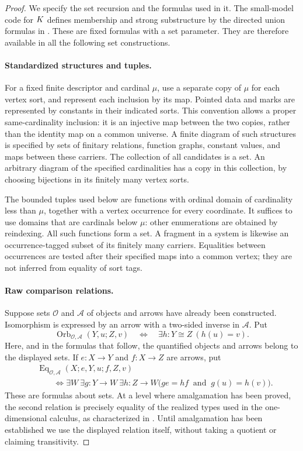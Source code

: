 \begin{proof}
We specify the set recursion and the formulas used in it.  The small-model
code for $K$ defines membership and strong substructure by the directed
union formulas in .  These are fixed
formulas with a set parameter.  They are therefore available in all the
following set constructions.

\paragraph{Standardized structures and tuples.}
For a fixed finite descriptor and cardinal $\mu$, use a separate copy of
$\mu$ for each vertex sort, and represent each inclusion by its map.
Pointed data and marks are represented by constants in their indicated
sorts.  This convention allows a proper same-cardinality inclusion: it is
an injective map between the two copies, rather than the identity map on
a common universe.  A finite diagram of such structures is specified by
sets of finitary relations, function graphs, constant values, and maps
between these carriers.  The collection of all candidates is a set.
An arbitrary diagram of the specified cardinalities has a copy in this
collection, by choosing bijections in its finitely many vertex sorts.

The bounded tuples used below are functions with ordinal domain of
cardinality less than $\mu$, together with a vertex occurrence for every
coordinate.  It suffices to use domains that are cardinals below $\mu$:
other enumerations are obtained by reindexing.  All such functions form
a set.  A fragment in a system is likewise an occurrence-tagged subset
of its finitely many carriers.  Equalities between occurrences are tested
after their specified maps into a common vertex; they are not inferred
from equality of sort tags.

\paragraph{Raw comparison relations.}
Suppose sets $\mathcal O$ and $\mathcal A$ of objects and arrows have already
been constructed.  Isomorphism is expressed by an arrow with a two-sided
inverse in $\mathcal A$.  Put
\[
 \operatorname{Orb}_{\mathcal O,\mathcal A}(Y,u;Z,v)
 \quad\Longleftrightarrow\quad
 \exists h\colon Y\mathrel{\cong}Z\ (h(u)=v).
\]
Here, and in the formulas that follow, the quantified objects and arrows
belong to the displayed sets.  If $e\colon X\to Y$ and $f\colon X\to Z$
are arrows, put
\begin{align*}
 &\operatorname{Eq}_{\mathcal O,\mathcal A}
       (X;e,Y,u;f,Z,v)\\
 &\qquad\Longleftrightarrow
 \exists W\ \exists g\colon Y\to W\ \exists h\colon Z\to W
       \bigl(g e=h f\ \text{ and }\ g(u)=h(v)\bigr).
\end{align*}
These are formulas about sets.  At a level where amalgamation has been
proved, the second relation is precisely equality of the realized types
used in the one-dimensional calculus, as characterized in
.  Until amalgamation has been
established we use the displayed relation itself, without taking a
quotient or claiming transitivity.


\end{proof}
